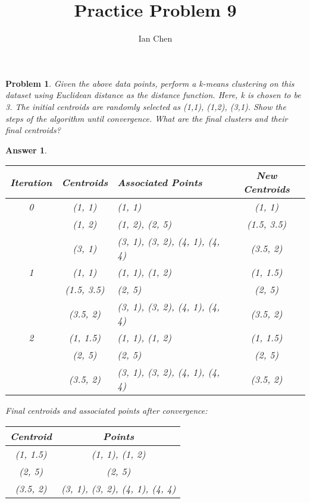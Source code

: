 \documentclass[11pt]{article}
\author{Ian Chen}
\title{Practice Problem 9}
\theoremstyle{description}
\newtheorem{problem}{Problem}
\theoremstyle{break}
\newtheorem*{answer}{Answer}
\begin{document}
    \maketitle

    \begin{problem}
        Given the above data points, perform a k-means clustering on this dataset using Euclidean
        distance as the distance function.
        Here, k is chosen to be 3.
        The initial centroids are randomly selected as (1,1), (1,2), (3,1).
        Show the steps of the algorithm until convergence.
        What are the final clusters and their final centroids?
    \end{problem}
    \begin{answer}
        \begin{tabular}{c|c|l|c}
            Iteration & Centroids & Associated Points              & New Centroids \\
            \hline
            0         & (1, 1)    & (1, 1)                         & (1, 1)        \\
            & (1, 2)    & (1, 2), (2, 5)                 & (1.5, 3.5)    \\
            & (3, 1)    & (3, 1), (3, 2), (4, 1), (4, 4) & (3.5, 2)      \\
            \hline
            1 & (1, 1) & (1, 1), (1, 2) & (1, 1.5)\\
            & (1.5, 3.5) & (2, 5) & (2, 5)\\
            & (3.5, 2) & (3, 1), (3, 2), (4, 1), (4, 4) & (3.5, 2)\\
            \hline
            2 & (1, 1.5) & (1, 1), (1, 2) & (1, 1.5)\\
            & (2, 5) & (2, 5) & (2, 5)\\
            & (3.5, 2) & (3, 1), (3, 2), (4, 1), (4, 4) & (3.5, 2)\\
        \end{tabular}
        \bigbreak
        Final centroids and associated points after convergence:\\
        \begin{tabular}{c|c}
            Centroid & Points\\
            \hline
            (1, 1.5) & (1, 1), (1, 2)\\
            (2, 5) & (2, 5)\\
            (3.5, 2) & (3, 1), (3, 2), (4, 1), (4, 4)\\
        \end{tabular}
    \end{answer}
\end{document}
